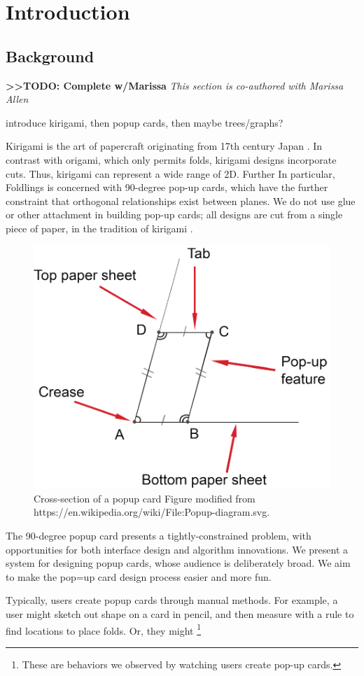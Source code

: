 \chapter{Introduction}

\section{Background}\label{background}

\textbf{\textgreater{}\textgreater{}TODO: Complete w/Marissa} \emph{This
section is co-authored with Marissa Allen}

introduce kirigami, then popup cards, then maybe trees/graphs?

Kirigami is the art of papercraft originating from 17th century Japan
\citet{temko1978magic}. In contrast with origami, which only permits
folds, kirigami designs incorporate cuts. Thus, kirigami can represent a
wide range of 2D. Further In particular, Foldlings is concerned with
90-degree pop-up cards, which have the further constraint that
orthogonal relationships exist between planes. We do not use glue or
other attachment in building pop-up cards; all designs are cut from a
single piece of paper, in the tradition of kirigami
\citet{temko1978magic}.

\begin{figure}[htbp]
\centering
\includegraphics{figures/shared/01_Background/popup-diagram.pdf}
\caption{Cross-section of a popup card Figure modified from
https://en.wikipedia.org/wiki/File:Popup-diagram.svg.}
\end{figure}

The 90-degree popup card presents a tightly-constrained problem, with
opportunities for both interface design and algorithm innovations. We
present a system for designing popup cards, whose audience is
deliberately broad. We aim to make the pop=up card design process easier
and more fun.

Typically, users create popup cards through manual methods. For example,
a user might sketch out shape on a card in pencil, and then measure with
a rule to find locations to place folds. Or, they might \footnote{These
  are behaviors we observed by watching users create pop-up cards.}
